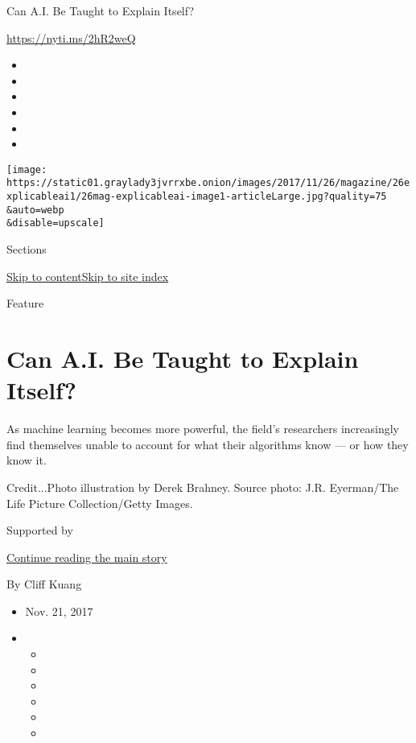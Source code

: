 Can A.I. Be Taught to Explain Itself?

\url{https://nyti.ms/2hR2weQ}

\begin{itemize}
\item
\item
\item
\item
\item
\item
\end{itemize}

\texttt{[image: https://static01.graylady3jvrrxbe.onion/images/2017/11/26/magazine/26explicableai1/26mag-explicableai-image1-articleLarge.jpg?quality=75\\\&auto=webp\\\&disable=upscale]}

Sections

\protect\hyperlink{site-content}{Skip to
content}\protect\hyperlink{site-index}{Skip to site index}

Feature

\hypertarget{can-ai-be-taught-to-explain-itself}{%
\section{Can A.I. Be Taught to Explain
Itself?}\label{can-ai-be-taught-to-explain-itself}}

As machine learning becomes more powerful, the field's researchers
increasingly find themselves unable to account for what their algorithms
know --- or how they know it.

Credit...Photo illustration by Derek Brahney. Source photo: J.R.
Eyerman/The Life Picture Collection/Getty Images.

Supported by

\protect\hyperlink{after-sponsor}{Continue reading the main story}

By Cliff Kuang

\begin{itemize}
\item
  Nov. 21, 2017
\item
  \begin{itemize}
  \item
  \item
  \item
  \item
  \item
  \item
  \end{itemize}
\end{itemize}

